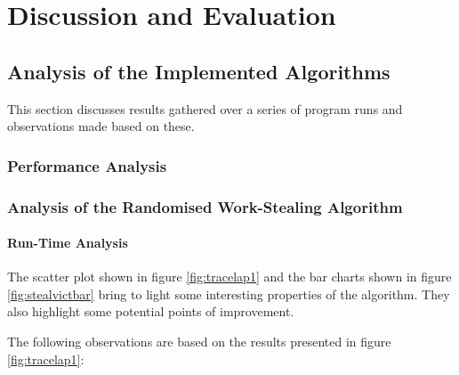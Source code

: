 \chapter{Discussion and Evaluation}
\section{Analysis of the Implemented Algorithms}

This section discusses results gathered over a series of program runs and observations made based on these. 

\subsection{Performance Analysis}




\subsection{Analysis of the Randomised Work-Stealing Algorithm}

\subsubsection*{Run-Time Analysis}

The scatter plot shown in figure \ref{fig:tracelap1} and the bar charts shown in figure \ref{fig:stealvictbar} 
bring to light some interesting properties of the algorithm.
They also highlight some potential points of improvement.



The following observations are based on the results presented in figure \ref{fig:tracelap1}:

